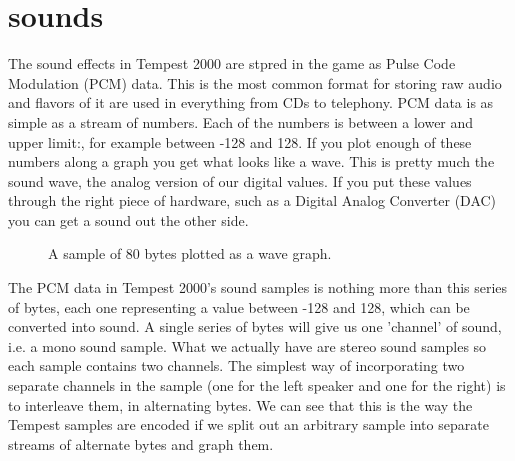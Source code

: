 \chapter{sounds}
\lhead[tempest 2000]{}
\label{sec:listing}
\lstset{style=68KStyle}

The sound effects in Tempest 2000 are stpred in the game as Pulse Code Modulation (PCM) data. This is the most common format for storing
raw audio and flavors of it are used in everything from CDs to telephony. PCM data is as simple as a stream of numbers. Each of the numbers
is between a lower and upper limit:, for example between -128 and 128. If you plot enough of these numbers along a graph you get what looks like
a wave. This is pretty much the sound wave, the analog version of our digital values. If you put these values through the right piece of hardware,
such as a Digital Analog Converter (DAC) you can get a sound out the other side.

\begin{figure}[H]
    \centering
    \begin{adjustbox}{width=7cm,center}
    \end{adjustbox}
  \caption{A sample of 80 bytes plotted as a wave graph.}
\end{figure}

The PCM data in Tempest 2000's sound samples is nothing more than this series of bytes, each one representing a value between -128 and 128, which can
be converted into sound. A single series of bytes will give us one 'channel' of sound, i.e. a mono sound sample. What we actually have are stereo
sound samples so each sample contains two channels. The simplest way of incorporating two separate channels in the sample (one for the left speaker
and one for the right) is to interleave them, in alternating bytes. We can see that this is the way the Tempest samples are encoded if we split out
an arbitrary sample into separate streams of alternate bytes and graph them.


